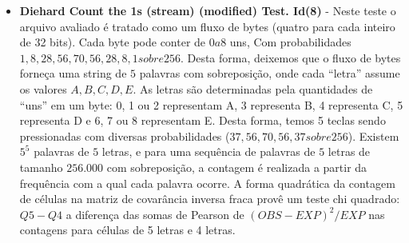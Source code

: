 \begin{itemize}
   \item \textbf{Diehard Count the 1s (stream) (modified) Test. Id(8)} - Neste teste o arquivo avaliado é tratado como um fluxo de bytes (quatro para cada inteiro de 32 bits). Cada byte pode conter de $0 a 8$ uns, Com probabilidades $1, 8, 28, 56, 70, 56, 28, 8, 1 sobre  256$. Desta forma, deixemos que o fluxo de bytes forneça uma string de $5$ palavras com sobreposição, onde cada ``letra'' assume os valores $A, B, C, D, E$. As letras são determinadas pela quantidades de ``uns'' em um byte: 0, 1 ou 2 representam A, 3 representa B, 4 representa C, 5 representa D e 6, 7 ou 8 representam E. Desta forma, temos 5 teclas sendo pressionadas com diversas probabilidades ($37,56,70,56,37 sobre 256$). Existem $5^{5}$ palavras de $5$ letras, e para uma sequência de palavras de $5$ letras de tamanho $256.000$ com sobreposição, a contagem é realizada a partir da frequência com a qual cada palavra ocorre. A forma quadrática da contagem de células na matriz de covarância inversa fraca provê um teste chi quadrado: $Q5-Q4$ a diferença das somas de Pearson de $(OBS-EXP)^2/EXP$ nas contagens para células de 5 letras e 4 letras.
   

\end{itemize}

